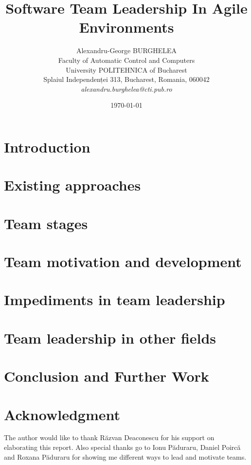 \documentclass[12pt]{article}
\title{Software Team Leadership In Agile Environments}
\author{Alexandru-George BURGHELEA\\
Faculty of Automatic Control and Computers\\
University POLITEHNICA of Bucharest\\
Splaiul Independenței 313, Bucharest, Romania, 060042 \\
\emph{alexandru.burghelea@cti.pub.ro}}
\date{\today}
\begin{document}
\maketitle

\begin{abstract}

\end{abstract}

\section{Introduction}
\label{sec:introduction}


\section{Existing approaches}
\label{sec:existingapproaches}


\section{Team stages}
\label{sec:teamstages}


\section{Team motivation and development}
\label{sec:teamdevelopment}


\section{Impediments in team leadership}
\label{sec:impediments}


\section{Team leadership in other fields}
\label{sec:otherfields}


\section{Conclusion and Further Work}
\label{sec:conclusion}


\section*{Acknowledgment}
\label{sec:acknowledgment}
The author would like to thank R\u{a}zvan Deaconescu for his support on elaborating this report. Also special thanks go to Ionu P\u{a}duraru, Daniel Poirc\u{a} and Roxana P\u{a}duraru for showing me different ways to lead and motivate teams.



\end{document}
